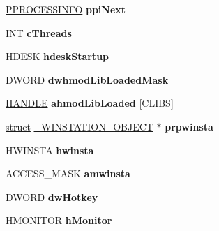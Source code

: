 \begin{DoxyCompactItemize}
\hyperlink{struct___p_r_o_c_e_s_s_i_n_f_o}{P\+P\+R\+O\+C\+E\+S\+S\+I\+N\+FO} {\bfseries ppi\+Next}
\item 
\mbox{\label{struct___p_r_o_c_e_s_s_i_n_f_o_a038623389c0d0d67ae8221d85cc1ef3a}} 
I\+NT {\bfseries c\+Threads}
\item 
\mbox{\label{struct___p_r_o_c_e_s_s_i_n_f_o_a3d85c4673388d1254305be006846f8eb}} 
H\+D\+E\+SK {\bfseries hdesk\+Startup}
\item 
\mbox{\label{struct___p_r_o_c_e_s_s_i_n_f_o_a43f6c92afc954f70a58b2759139f3a68}} 
D\+W\+O\+RD {\bfseries dwhmod\+Lib\+Loaded\+Mask}
\item 
\mbox{\label{struct___p_r_o_c_e_s_s_i_n_f_o_ad2f70413f13a2f035d853663a1d6b065}} 
\hyperlink{interfacevoid}{H\+A\+N\+D\+LE} {\bfseries ahmod\+Lib\+Loaded} \mbox{[}C\+L\+I\+BS\mbox{]}
\item 
\mbox{\label{struct___p_r_o_c_e_s_s_i_n_f_o_afaa00d50c513ab626a2baba4f0f1f817}} 
\hyperlink{interfacestruct}{struct} \hyperlink{struct___w_i_n_s_t_a_t_i_o_n___o_b_j_e_c_t}{\+\_\+\+W\+I\+N\+S\+T\+A\+T\+I\+O\+N\+\_\+\+O\+B\+J\+E\+CT} $\ast$ {\bfseries prpwinsta}
\item 
\mbox{\label{struct___p_r_o_c_e_s_s_i_n_f_o_a1e9d9a37a9e3086512cd48b74b6f0ae1}} 
H\+W\+I\+N\+S\+TA {\bfseries hwinsta}
\item 
\mbox{\label{struct___p_r_o_c_e_s_s_i_n_f_o_ae8c1eb874b478afda0b78884179f3116}} 
A\+C\+C\+E\+S\+S\+\_\+\+M\+A\+SK {\bfseries amwinsta}
\item 
\mbox{\label{struct___p_r_o_c_e_s_s_i_n_f_o_acf999c9b6150f14cba599ab26e05b4da}} 
D\+W\+O\+RD {\bfseries dw\+Hotkey}
\item 
\mbox{\label{struct___p_r_o_c_e_s_s_i_n_f_o_a7ecece98a943e72e540ef29806a456f5}} 
\hyperlink{interfacevoid}{H\+M\+O\+N\+I\+T\+OR} {\bfseries h\+Monitor}
\item 
\mbox{\label{struct___p_r_o_c_e_s_s_i_n_f_o_a0ee891a048efceca4cfd377a633f20f1}} 

\end{DoxyCompactItemize}
